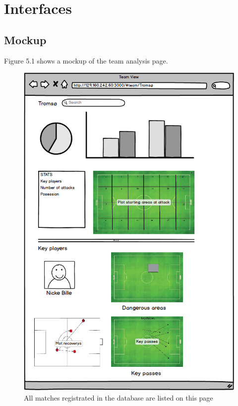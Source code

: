 
\section{Interfaces}

\subsection{Mockup}

Figure 5.1 shows a mockup of the team analysis page. 

\begin{figure}[ht!]
\centering
\includegraphics[width=150mm]{images/general/mockup.png}
\caption{All matches registrated in the database are listed on this page}
\label{overflow}
\end{figure}


